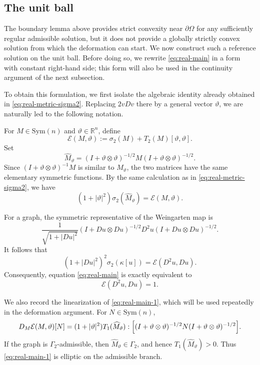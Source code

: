 \documentclass{article}
\numberwithin{equation}{section}
\begin{document}
\subsection{The unit ball}
\label{subsubsec:real-ball}

The boundary lemma above provides strict convexity near
$\partial\Omega$ for any sufficiently regular admissible solution,
but it does not provide a globally strictly convex solution from
which the deformation can start. We now construct such a reference
solution on the unit ball. Before doing so, we rewrite
\eqref{eq:real-main} in a form with constant right-hand side; this
form will also be used in the continuity argument of the next
subsection.

To obtain this formulation, we first isolate the algebraic identity already
obtained in \eqref{eq:real-metric-sigma2}. Replacing $2vDv$ there by a general vector $\vartheta$, we are naturally led to the following
notation.

For $M\in\mathrm{Sym}(n)$ and $\vartheta\in\mathbb R^n$, define
\begin{equation}\label{eq:E-definition}
\mathcal E(M,\vartheta)
:=
\sigma_2(M)+T_2(M)[\vartheta,\vartheta].
\end{equation}
Set
\[
\widehat M_\vartheta
=
(I+\vartheta\otimes\vartheta)^{-1/2}
M
(I+\vartheta\otimes\vartheta)^{-1/2}.
\]
Since
$(I+\vartheta\otimes\vartheta)^{-1}M$
is similar to $\widehat M_\vartheta$, the two matrices have the same
elementary symmetric functions.
By the same calculation as in \eqref{eq:real-metric-sigma2}, we have
\[
(1+|\vartheta|^2)\sigma_2(\widehat M_\vartheta)
=
\mathcal E(M,\vartheta).
\]

For a graph, the symmetric representative of the Weingarten map is
\[
\frac{1}{\sqrt{1+|Du|^2}}
(I+Du\otimes Du)^{-1/2}
D^2u
(I+Du\otimes Du)^{-1/2}.
\]
It follows that
\[
(1+|Du|^2)^2\sigma_2(\kappa[u])
=
\mathcal E(D^2u,Du).
\]
Consequently, equation \eqref{eq:real-main} is exactly equivalent
to
\begin{equation}\label{eq:real-main-1}
\mathcal E(D^2u,Du)=1.
\end{equation}

We also record the linearization of \eqref{eq:real-main-1}, which will
be used repeatedly in the deformation argument. For
$N\in\mathrm{Sym}(n)$,
\begin{equation}\label{eq:E-Hessian-linearization}
D_M\mathcal E(M,\vartheta)[N]
=
(1+|\vartheta|^2)
T_1(\widehat M_\vartheta):
\Bigl[
(I+\vartheta\otimes\vartheta)^{-1/2}
N
(I+\vartheta\otimes\vartheta)^{-1/2}
\Bigr].
\end{equation}
If the graph is $\Gamma_2$-admissible, then
$\widehat M_\vartheta\in\Gamma_2$, and hence
$T_1(\widehat M_\vartheta)>0$. Thus
\eqref{eq:real-main-1} is elliptic on the admissible branch.
\end{document}
